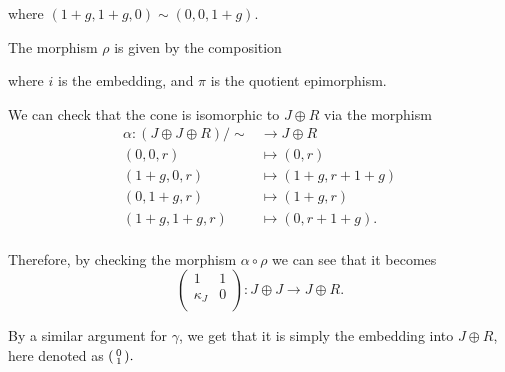 \begin{example}
\begin{center}
	\end{center}
	where \( (1 + g, 1 + g, 0) \sim (0, 0, 1 + g) \).

	The morphism \( \rho \) is given by the composition
	\begin{center}
	\end{center}
	where \( i \) is the embedding, and \( \pi \) is the quotient epimorphism.

	We can check that the cone is isomorphic to \( J \oplus R \) via the morphism
	\begin{align*}
		\alpha: (J \oplus J \oplus R)/\sim &\to J \oplus R \\
		(0, 0, r) &\mapsto (0, r) \\
		(1 + g, 0, r) &\mapsto (1 + g, r + 1 + g) \\
		(0, 1 + g, r) &\mapsto (1 + g, r) \\
		(1 + g, 1 + g, r) &\mapsto (0, r + 1 + g). \\
	\end{align*}

	Therefore, by checking the morphism \( \alpha \circ \rho \) we can see that it becomes
	\[
		\begin{pmatrix}
			1 & 1 \\
			\kappa_J & 0 \\
		\end{pmatrix}
		: J \oplus J \to J \oplus R.
	\]

	By a similar argument for \( \gamma \), we get that it is simply the embedding into \( J \oplus R \), here denoted as \( \begin{psmallmatrix} 0 \\ 1 \\ \end{psmallmatrix}. \)


\end{example}
